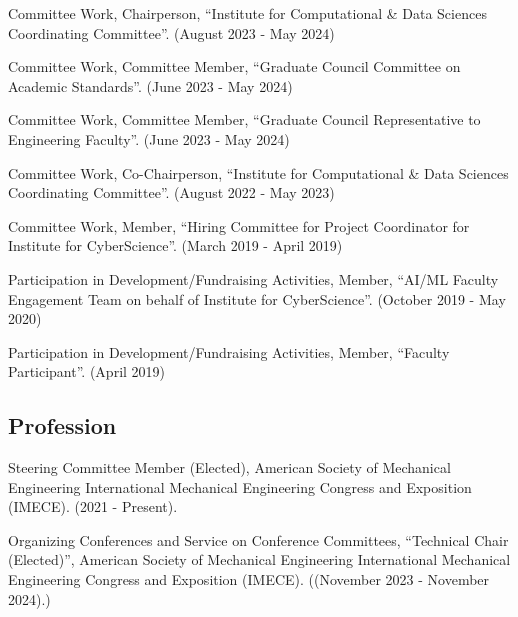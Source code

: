 \documentclass[a4paper,10pt]{article}
\begin{document}
        \noindent Committee Work, Chairperson, ``Institute for Computational \& Data Sciences Coordinating Committee''. (August 2023 - May 2024)\vspace{0.25cm}
        
        \noindent Committee Work, Committee Member, ``Graduate Council Committee on Academic Standards''. (June 2023 - May 2024)\vspace{0.25cm}
        
        \noindent Committee Work, Committee Member, ``Graduate Council Representative to Engineering Faculty''. (June 2023 - May 2024)\vspace{0.25cm}
        
        \noindent Committee Work, Co-Chairperson, ``Institute for Computational \& Data Sciences Coordinating Committee''. (August 2022 - May 2023)\vspace{0.25cm}
        
        \noindent Committee Work, Member, ``Hiring Committee for Project Coordinator for Institute for CyberScience''. (March 2019 - April 2019)\vspace{0.25cm}
        
        \noindent Participation in Development/Fundraising Activities, Member, ``AI/ML Faculty Engagement Team on behalf of Institute for CyberScience''. (October 2019 - May 2020)\vspace{0.25cm}
        
        \noindent Participation in Development/Fundraising Activities, Member, ``Faculty Participant''. (April 2019)\vspace{0.25cm}
        
    \subsection*{Profession}
    
        \noindent Steering Committee Member (Elected), American Society of Mechanical Engineering International Mechanical Engineering Congress and Exposition (IMECE). (2021 - Present). \vspace{0.25cm}
        
        \noindent Organizing Conferences and Service on Conference Committees, ``Technical Chair (Elected)'', American Society of Mechanical Engineering International Mechanical Engineering Congress and Exposition (IMECE). ((November 2023 - November 2024).)\vspace{0.25cm}
        
\end{document}

